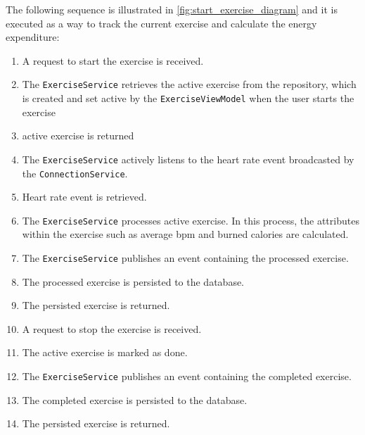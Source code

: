 The following sequence is illustrated in \autoref{fig:start_exercise_diagram} and it is executed as a way to track the current exercise and calculate the energy expenditure:
\begin{enumerate}
    \item A request to start the exercise is received.
    \item The \texttt{ExerciseService} retrieves the active exercise from the repository, which is created and set active by the \texttt{ExerciseViewModel} when the user starts the exercise
    \item active exercise is returned
    \item The \texttt{ExerciseService} actively listens to the heart rate event broadcasted by the \texttt{ConnectionService}.
    \item Heart rate event is retrieved.
    \item The \texttt{ExerciseService} processes active exercise. In this process, the attributes within the exercise such as average bpm and burned calories are calculated.
    \item The \texttt{ExerciseService} publishes an event containing the processed exercise.
    \item The processed exercise is persisted to the database.
    \item The persisted exercise is returned.
    \item A request to stop the exercise is received.
    \item The active exercise is marked as done.
    \item The \texttt{ExerciseService} publishes an event containing the completed exercise.
    \item The completed exercise is persisted to the database.
    \item The persisted exercise is returned.
\end{enumerate}

